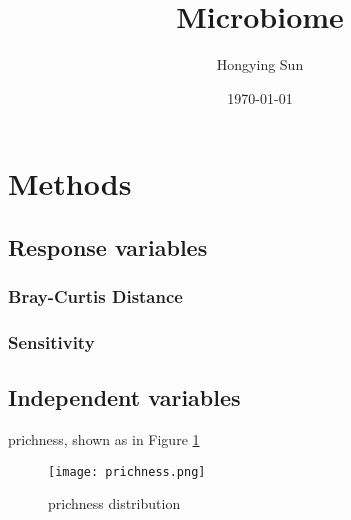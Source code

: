 \documentclass{article}
\title{Microbiome}
\author{Hongying Sun
	}
\date{\today}
\begin{document}
\maketitle


\section{Methods}
\subsection{Response variables}
\subsubsection{Bray-Curtis Distance}
\subsubsection{Sensitivity}
\subsection{Independent variables}
prichness, shown as in Figure \ref{prichness-community}
\begin{figure}[htbp]
	\centering
	\texttt{[image: prichness.png]}\\
	\caption{prichness distribution}
	\label{prichness-community}
\end{figure}
\end{document}
